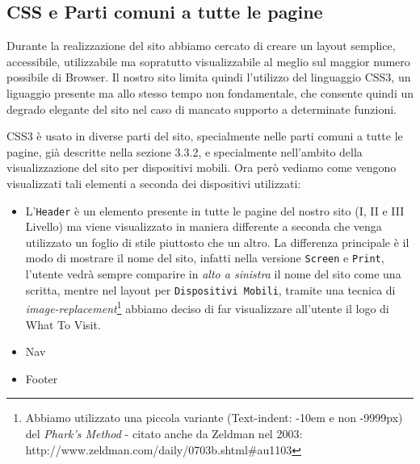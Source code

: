 \subsection{CSS e Parti comuni a tutte le pagine}
Durante la realizzazione del sito abbiamo cercato di creare un layout semplice, accessibile, utilizzabile ma sopratutto visualizzabile al meglio sul maggior numero possibile di Browser. Il nostro sito limita quindi l'utilizzo del linguaggio CSS3, un liguaggio presente ma allo stesso tempo non fondamentale, che consente quindi un degrado elegante del sito nel caso di mancato supporto a determinate funzioni.

CSS3 è usato in diverse parti del sito, specialmente nelle parti comuni a tutte le pagine, già descritte nella sezione 3.3.2, e specialmente nell'ambito della visualizzazione del sito per dispositivi mobili. Ora però vediamo come vengono visualizzati tali elementi a seconda dei dispositivi utilizzati:
\begin{itemize}
\item L'\texttt{Header} è un elemento presente in tutte le pagine del nostro sito (I, II e III Livello) ma viene visualizzato in maniera differente a seconda che venga utilizzato un foglio di stile piuttosto che un altro. La differenza principale è il modo di mostrare il nome del sito, infatti nella versione \texttt{Screen} e \texttt{Print}, l'utente vedrà sempre comparire in \textit{alto a sinistra} il nome del sito come una scritta, mentre nel layout per \texttt{Dispositivi Mobili}, tramite una tecnica di \textit{image-replacement}\footnote{Abbiamo utilizzato una piccola variante (Text-indent: -10em e non -9999px) del \textit{Phark's Method} - citato anche da Zeldman nel 2003: http://www.zeldman.com/daily/0703b.shtml#au1103} abbiamo deciso di far visualizzare all'utente il logo di What To Visit.
\item Nav
\item Footer
\end{itemize}